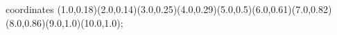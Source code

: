 					coordinates { (1.0,0.18)(2.0,0.14)(3.0,0.25)(4.0,0.29)(5.0,0.5)(6.0,0.61)(7.0,0.82)(8.0,0.86)(9.0,1.0)(10.0,1.0)};